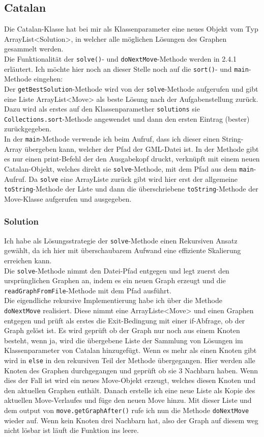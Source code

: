 \documentclass[12pt,a4paper]{article}
\begin{document}
\subsection{Catalan}
Die Catalan-Klasse hat bei mir als Klassenparameter eine neues Objekt vom Typ ArrayList<Solution>, in welcher alle möglichen Lösungen des Graphen gesammelt werden.\\
Die Funktionalität der \texttt{solve()}- und \texttt{doNextMove}-Methode werden in 2.4.1 erläutert. Ich möchte hier noch an dieser Stelle noch auf die \texttt{sort()}- und \texttt{main}-Methode eingehen:\\
Der \texttt{getBestSolution}-Methode wird von der \texttt{solve}-Methode aufgerufen und gibt eine Liste ArrayList<Move> als beste Lösung nach der Aufgabenstellung zurück. Dazu wird als erstes auf den Klassenparamether \texttt{solutions} sie \texttt{Collections.sort}-Methode angewendet und dann den ersten Eintrag (bester) zurückgegeben.\\
In der \texttt{main}-Methode verwende ich beim Aufruf, dass ich dieser einen String-Array übergeben kann, welcher der Pfad der GML-Datei ist. In der Methode gibt es nur einen print-Befehl der den Ausgabekopf druckt, verknüpft mit einem neuen Catalan-Objekt, welches direkt sie \texttt{solve}-Methode, mit dem Pfad aus dem \texttt{main}-Aufruf. Da \texttt{solve} eine ArrayListe zurück gibt wird hier erst der allgemeine \texttt{toString}-Methode der Liste und dann die überschriebene \texttt{toString}-Methode der Move-Klasse aufgerufen und ausgegeben.

\subsubsection{Solution}
Ich habe als Lösungsstrategie der \texttt{solve}-Methode einen Rekursiven Ansatz gewählt, da ich hier mit überschaubarem Aufwand eine effiziente Skalierung erreichen kann.\\
Die \texttt{solve}-Methode nimmt den Datei-Pfad entgegen und legt zuerst den ursprünglichen Graphen an, indem es ein neuen Graph erzeugt und die \texttt{readGraphFromFile}-Methode mit dem Pfad ausführt.\\
Die eigendliche rekursive Implementierung habe ich über die Methode \texttt{doNextMove} realisiert. Diese nimmt eine ArrayListe<Move> und einen Graphen entgegen und prüft als erstes die Exit-Bedingung mit einer if-Abfrage, ob der Graph gelöst ist. Es wird geprüft ob der Graph nur noch aus einem Knoten besteht, wenn ja, wird die übergebene Liste der \glqq Sammlung\grqq{} von Lösungen im Klassenparameter von Catalan hinzugefügt. Wenn es mehr als einen Knoten gibt wird in \texttt{else} in den rekursiven Teil der Methode übergegangen. Hier werden alle Knoten des Graphen durchgegangen und geprüft ob sie 3 Nachbarn haben. Wenn dies der Fall ist wird ein neues Move-Objekt erzeugt, welches diesen Knoten und den aktuellen Graphen enthält. Danach erstelle ich eine neue Liste als Kopie des aktuellen Move-Verlaufes und füge den neuen Move hinzu. Mit dieser Liste und dem output von \texttt{move.getGraphAfter()} rufe ich nun die Methode \texttt{doNextMove} wieder auf. Wenn kein Knoten drei Nachbarn hat, also der Graph auf diesem weg nicht lösbar ist läuft die Funktion ins leere.
\end{document}
